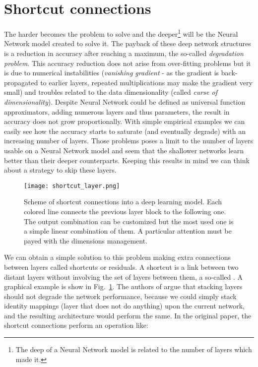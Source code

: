 \documentclass{standalone}
\begin{document}
\section[Shortcut]{Shortcut connections}\label{NN:shortcut}

The harder becomes the problem to solve and the deeper\footnote{
  The deep of a Neural Network model is related to the number of layers which made it.
} will be the Neural Network model created to solve it.
The payback of these deep network structures is a reduction in accuracy after reaching a maximum, the so-called \emph{degradation problem}.
This accuracy reduction does not arise from over-fitting problems but it is due to numerical instabilities (\emph{vanishing gradient} - as the gradient is back-propagated to earlier layers, repeated multiplications may make the gradient very small) and troubles related to the data dimensionality (called \emph{curse of dimensionality}).
Despite Neural Network could be defined as universal function approximators, adding numerous layers and thus parameters, the result in accuracy does not grow proportionally.
With simple empirical examples we can easily see how the accuracy starts to saturate (and eventually degrade) with an increasing number of layers.
Those problems poses a limit to the number of layers usable on a Neural Network model and seem that the shallower networks learn better than their deeper counterparts.
Keeping this results in mind we can think about a strategy to skip these  layers.

\begin{center}
\begin{figure}[htbp]
\centering
\texttt{[image: shortcut\_layer.png]}
\caption{Scheme of shortcut connections into a deep learning model.
Each colored line connects the previous layer block to the following one.
The output combination can be customized but the most used one is a simple linear combination of them.
A particular attention must be payed with the dimensions management.
}
\label{fig:shortcut}
\end{figure}
\end{center}

We can obtain a simple solution to this problem making extra connections between layers called shortcuts or residuals.
A shortcut is a link between two distant layers without involving the set of layers between them, a so-called .
A graphical example is show in Fig.~\ref{fig:shortcut}.
The authors of \cite{he2015deep} argue that stacking layers should not degrade the network performance, because we could simply stack identity mappings (layer that does not do anything) upon the current network, and the resulting architecture would perform the same.
In the original paper, the shortcut connections perform an operation like:
\end{document}
